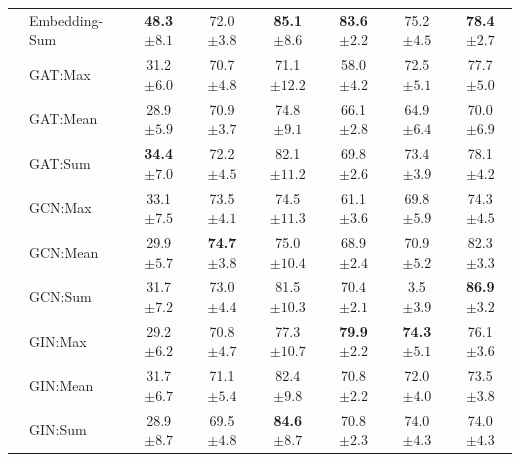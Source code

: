 \begin{table}[!htb]
{\begin{tabular}{@{}c <{\enspace}@{}lcccccc@{}}
			\\ 
			& \textsf{Embedding-Sum} & \textbf{48.3} \scriptsize	$\pm 8.1$          & 72.0  \scriptsize $\pm 3.8$             & \textbf{85.1} \scriptsize $\pm 8.6$	     & \textbf{83.6}   \scriptsize $\pm 2.2$         & 75.2  \scriptsize $\pm 4.5$ & \textbf{78.4} \scriptsize $\pm 2.7$    
			\\ 
			\cmidrule{2-8}
			\multirow{9}{*}{\rotatebox{90}{Graph Neural Networks}} 
			& \textsf{GAT:Max}                    & 31.2 \scriptsize $\pm 6.0$        & 70.7 \scriptsize $\pm 4.8$          & 71.1 \scriptsize $\pm 12.2$ & 58.0 \scriptsize $\pm 4.2$          & 72.5 \scriptsize $\pm 5.1$         & 77.7 \scriptsize $\pm 5.0$ 
			\\ 
			& \textsf{GAT:Mean}    & 28.9 \scriptsize $\pm 5.9$          & 70.9 \scriptsize $\pm 3.7$           & 74.8 \scriptsize $\pm 9.1$            & 66.1 \scriptsize $\pm 2.8$         & 64.9 \scriptsize $\pm 6.4$  & 70.0 \scriptsize $\pm 6.9$
			\\ 
			& \textsf{GAT:Sum}                  & \textbf{34.4} \scriptsize $\pm 7.0$          & 72.2 \scriptsize $\pm 4.5$	            & 82.1 \scriptsize $\pm 11.2$            & 69.8 \scriptsize $\pm 2.6$	          & 73.4 \scriptsize $\pm 3.9$ & 78.1 \scriptsize $\pm 4.2$        
			\\
			\cmidrule{2-8}
			& \textsf{GCN:Max} & 33.1 \scriptsize $\pm 7.5$ &	73.5 \scriptsize $\pm 4.1$	& 74.5 \scriptsize $\pm 11.3$ & 61.1 \scriptsize $\pm 3.6$ &	69.8 \scriptsize $\pm 5.9$ & 74.3 \scriptsize $\pm 4.5$
			\\ 
			& \textsf{GCN:Mean} & 29.9 \scriptsize $\pm 5.7$ &	\textbf{74.7} \scriptsize $\pm 3.8$ & 75.0 \scriptsize $\pm 10.4$ &	68.9 \scriptsize $\pm 2.4$ &	70.9 \scriptsize $\pm 5.2$ & 82.3 \scriptsize $\pm 3.3$
			\\ 
			& \textsf{GCN:Sum} & 31.7 \scriptsize $\pm 7.2$ &	73.0 \scriptsize $\pm 4.4$	& 81.5 \scriptsize $\pm 10.3$ & 70.4 \scriptsize $\pm 2.1$ & 3.5 \scriptsize $\pm 3.9$ & \textbf{86.9} \scriptsize $\pm 3.2$                       
			\\
			\cmidrule{2-8}	
						
			& \textsf{GIN:Max} & 29.2 \scriptsize $\pm 6.2$	& 70.8 \scriptsize $\pm 4.7$ & 77.3 \scriptsize $\pm 10.7$ & \textbf{79.9} \scriptsize $\pm 2.2$ & \textbf{74.3} \scriptsize $\pm 5.1$ & 76.1 \scriptsize $\pm 3.6$  
			\\ 
			& \textsf{GIN:Mean}  & 31.7 \scriptsize $\pm 6.7$	& 71.1 \scriptsize $\pm 5.4$ & 82.4 \scriptsize $\pm 9.8$ & 	70.8 \scriptsize $\pm 2.2$ & 72.0 \scriptsize $\pm 4.0$ & 73.5 \scriptsize $\pm 3.8$
			\\ 
			& \textsf{GIN:Sum} & 28.9 \scriptsize $\pm 8.7$ & 	69.5 \scriptsize $\pm 4.8$	& \textbf{84.6} \scriptsize $\pm 8.7$ & 70.8 \scriptsize $\pm 2.3$ & 74.0 \scriptsize $\pm 4.3$ & 74.0 \scriptsize $\pm 4.3$
			\\
			\bottomrule
		\end{tabular}}            
\end{table}

